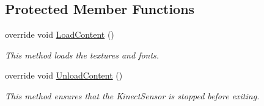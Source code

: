 \subsection*{Protected Member Functions}
\begin{DoxyCompactItemize}
\item 
override void \hyperlink{class_microsoft_1_1_samples_1_1_kinect_1_1_avateering_1_1_kinect_chooser_a4522920e8cdfb10fef30d242fcb92523}{Load\+Content} ()
\begin{DoxyCompactList}\small\item\em This method loads the textures and fonts. \end{DoxyCompactList}\item 
override void \hyperlink{class_microsoft_1_1_samples_1_1_kinect_1_1_avateering_1_1_kinect_chooser_a7ef341c7a8390e715f93c2a73ecb1e86}{Unload\+Content} ()
\begin{DoxyCompactList}\small\item\em This method ensures that the Kinect\+Sensor is stopped before exiting. \end{DoxyCompactList}\end{DoxyCompactItemize}
